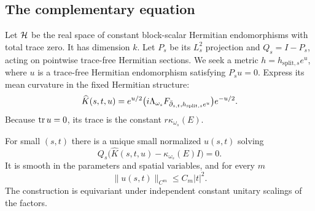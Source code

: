 \subsection{The complementary equation}
Let $\mathcal H$ be the real space of constant block-scalar Hermitian
endomorphisms with total trace zero. It has dimension $k$. Let
$P_s$ be its $L^2_s$ projection and $Q_s=I-P_s$, acting on
pointwise trace-free Hermitian sections. We seek a metric
$h=h_{\mathrm{split},s}e^u$, where $u$ is a trace-free Hermitian
endomorphism satisfying $P_su=0$.
Express its mean curvature in the fixed Hermitian structure:
\begin{equation}\label{eq:Khat}
 \widehat K(s,t,u)
 =e^{u/2}\bigl(i\Lambda_{\omega_s}F_{\bar\partial_{s,t},h_{\mathrm{split},s}e^u}\bigr)e^{-u/2}.
\end{equation}
Because $\operatorname{tr} u=0$, its trace is the constant $r\kappa_{\omega_s}(E)$.

\begin{lemma}\label{lem:complement}
For small $(s,t)$ there is a unique small normalized $u(s,t)$ solving
\[
 Q_s\bigl(\widehat K(s,t,u)-\kappa_{\omega_s}(E)I\bigr)=0.
\]
It is smooth in the parameters and spatial variables, and for every $m$
\begin{equation}\label{eq:u-estimate}
 \|u(s,t)\|_{C^m}\le C_m|t|^2.
\end{equation}
The construction is equivariant under independent constant unitary
scalings of the factors.
\end{lemma}


